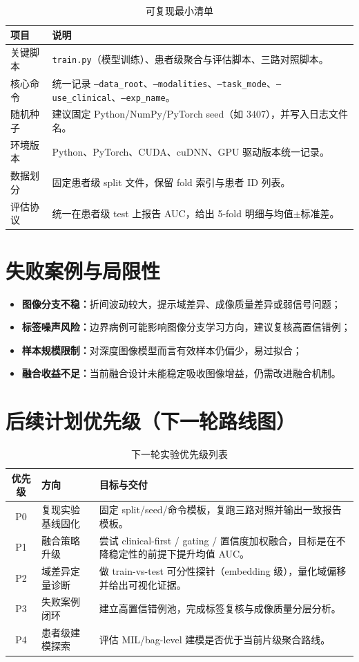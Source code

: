 \documentclass[12pt,a4paper]{ctexart}
\begin{document}
\begin{table}[H]
\centering
\caption{可复现最小清单}
\begin{tabular}{p{}p{}}
\toprule
项目 & 说明 \\
\midrule
关键脚本 & \texttt{train.py}（模型训练）、患者级聚合与评估脚本、三路对照脚本。 \\
核心命令 & 统一记录 \texttt{--data\_root}、\texttt{--modalities}、\texttt{--task\_mode}、\texttt{--use\_clinical}、\texttt{--exp\_name}。 \\
随机种子 & 建议固定 Python/NumPy/PyTorch seed（如 3407），并写入日志文件名。 \\
环境版本 & Python、PyTorch、CUDA、cuDNN、GPU 驱动版本统一记录。 \\
数据划分 & 固定患者级 split 文件，保留 fold 索引与患者 ID 列表。 \\
评估协议 & 统一在患者级 test 上报告 AUC，给出 5-fold 明细与均值$\pm$标准差。 \\
\bottomrule
\end{tabular}
\end{table}

\section{失败案例与局限性}

\begin{itemize}
  \item \textbf{图像分支不稳：}折间波动较大，提示域差异、成像质量差异或弱信号问题；
  \item \textbf{标签噪声风险：}边界病例可能影响图像分支学习方向，建议复核高置信错例；
  \item \textbf{样本规模限制：}对深度图像模型而言有效样本仍偏少，易过拟合；
  \item \textbf{融合收益不足：}当前融合设计未能稳定吸收图像增益，仍需改进融合机制。
\end{itemize}

\section{后续计划优先级（下一轮路线图）}

\begin{table}[H]
\centering
\caption{下一轮实验优先级列表}
\begin{tabular}{clp{}}
\toprule
优先级 & 方向 & 目标与交付 \\
\midrule
P0 & 复现实验基线固化 & 固定 split/seed/命令模板，复跑三路对照并输出一致报告模板。 \\
P1 & 融合策略升级 & 尝试 clinical-first / gating / 置信度加权融合，目标是在不降稳定性的前提下提升均值 AUC。 \\
P2 & 域差异定量诊断 & 做 train-vs-test 可分性探针（embedding 级），量化域偏移并给出可视化证据。 \\
P3 & 失败案例闭环 & 建立高置信错例池，完成标签复核与成像质量分层分析。 \\
P4 & 患者级建模探索 & 评估 MIL/bag-level 建模是否优于当前片级聚合路线。 \\
\bottomrule
\end{tabular}
\end{table}
\end{document}
